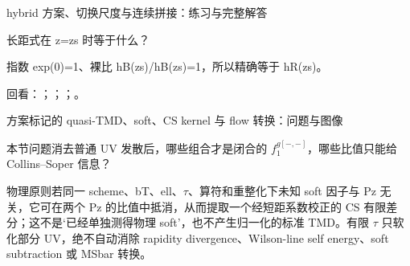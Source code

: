 \begin{frame}[t]{hybrid 方案、切换尺度与连续拼接：练习与完整解答}
\footnotesize
\begin{block}{}长距式在 z=zs 时等于什么？\end{block}
\begin{exampleblock}{}指数 exp(0)=1、裸比 hB(zs)/\allowbreak{}hB(zs)=1，所以精确等于 hR(zs)。\end{exampleblock}
\vfill
\scriptsize 回看：；；；。
\end{frame}

\begin{frame}[t]{方案标记的 quasi-TMD、soft、CS kernel 与 flow 转换：问题与图像}
\footnotesize
\begin{block}{本节问题}消去普通 UV 发散后，哪些组合才是闭合的 \ensuremath{f_1^{g[-,-]}}，哪些比值只能给 Collins--Soper 信息？\end{block}
\begin{block}{物理原则}\quad 若同一 scheme、bT、ell、\ensuremath{\tau}、算符和重整化下未知 soft 因子与 Pz 无关，它可在两个 Pz 的比值中抵消，从而提取一个经短距系数校正的 CS 有限差分；这不是‘已经单独测得物理 soft’，也不产生归一化的标准 TMD。有限 \ensuremath{\tau} 只软化部分 UV，绝不自动消除 rapidity divergence、Wilson-line self energy、soft subtraction 或 MSbar 转换。\end{block}
\end{frame}

